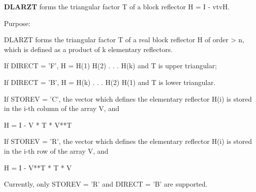 {\bfseries D\+L\+A\+R\+Z\+T} forms the triangular factor T of a block reflector H = I -\/ vtv\+H. 

 \begin{DoxyParagraph}{Purpose\+: }
\begin{DoxyVerb} DLARZT forms the triangular factor T of a real block reflector
 H of order > n, which is defined as a product of k elementary
 reflectors.

 If DIRECT = 'F', H = H(1) H(2) . . . H(k) and T is upper triangular;

 If DIRECT = 'B', H = H(k) . . . H(2) H(1) and T is lower triangular.

 If STOREV = 'C', the vector which defines the elementary reflector
 H(i) is stored in the i-th column of the array V, and

    H  =  I - V * T * V**T

 If STOREV = 'R', the vector which defines the elementary reflector
 H(i) is stored in the i-th row of the array V, and

    H  =  I - V**T * T * V

 Currently, only STOREV = 'R' and DIRECT = 'B' are supported.\end{DoxyVerb}
 
\end{DoxyParagraph}

